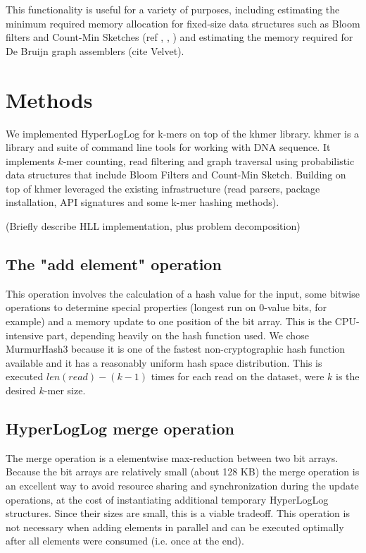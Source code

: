 \documentclass{bioinfo}
\begin{document}
This functionality is useful for a variety of purposes, including
estimating the minimum required memory allocation for fixed-size data
structures such as Bloom filters and Count-Min Sketches (ref
\citep{pell2012scaling}, \citep{georganas2014parallel},
\citep{khmer-counting}) and estimating the memory required for
De Bruijn graph assemblers (cite Velvet).




\section{Methods}

We implemented HyperLogLog for k-mers on top of the khmer library.
khmer is a library and suite of command line tools for working with
DNA sequence.  It implements $k$-mer counting, read filtering and
graph traversal using probabilistic data structures that include Bloom
Filters and Count-Min Sketch.  Building on top of khmer leveraged the
existing infrastructure (read parsers, package installation, API
signatures and some k-mer hashing methods).

(Briefly describe HLL implementation, plus problem decomposition)

\subsection{The "add element" operation}

This operation involves the calculation of a hash value for the input,
some bitwise operations to determine special properties (longest run on 0-value bits, for example)
and a memory update to one position of the bit array.
This is the CPU-intensive part,
depending heavily on the hash function used.
We chose MurmurHash3 because it is one of the fastest non-cryptographic hash function available
and it has a reasonably uniform hash space distribution.
This is executed $len(read) - (k-1)$ times for each read on the dataset,
were $k$ is the desired $k$-mer size.

\subsection{HyperLogLog merge operation}

The merge operation is a elementwise max-reduction between two bit arrays.
Because the bit arrays are relatively small (about 128 KB) the merge operation is an excellent way to avoid resource sharing and synchronization during the update operations,
at the cost of instantiating additional temporary HyperLogLog structures.
Since their sizes are small,
this is a viable tradeoff.
This operation is not necessary when adding elements in parallel and can be executed
optimally after all elements were consumed (i.e. once at the end).
\end{document}
